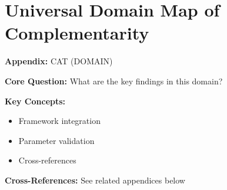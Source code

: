%
%
%

\chapter{Universal Domain Map of Complementarity}
\label{app:domain-catalog}


\begin{tcolorbox}[colback=blue!5!white, colframe=blue!75!black,
    title=Quick Reference: Appendix CAT]

\textbf{Appendix:} CAT (DOMAIN)

\textbf{Core Question:} What are the key findings in this domain?

\textbf{Key Concepts:}
\begin{itemize}[nosep]
\item Framework integration
\item Parameter validation
\item Cross-references
\end{itemize}

\textbf{Cross-References:} See related appendices below
\end{tcolorbox}

\begin{abstract}
Complementarity ($\gamma$) is a universal mathematical concept that manifests across
virtually all scientific disciplines. This appendix provides a comprehensive catalog
of 20+ domains where complementarity theory applies, organized into four clusters:
\textbf{Social Sciences} (Economics, Psychology, Management, Sociology, Political Science),
\textbf{Natural Sciences} (Physics, Chemistry, Biology, Ecology),
\textbf{Life Sciences} (Neuroscience, Medicine, Pharmacology, Nutrition),
and \textbf{Formal/Applied Sciences} (Computer Science, Engineering, Mathematics).
For each domain, we document the $\gamma$-interpretation, key researchers, measurement
approaches, empirical ranges, and connections to the EBF framework.
\end{abstract}

